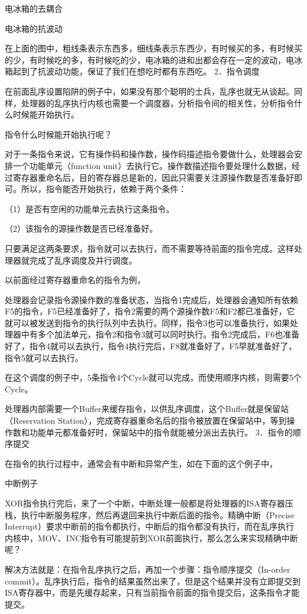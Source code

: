 \documentclass[12pt,UTF8]{ctexbook}
\begin{document}
电冰箱的去耦合

电冰箱的抗波动

在上面的图中，粗线条表示东西多，细线条表示东西少，有时候买的多，有时候买的少，有时候吃的多，有时候吃的少，电冰箱的进和出都会存在一定的波动，电冰箱起到了抗波动功能，保证了我们在想吃时都有东西吃。
2．指令调度

在前面乱序设置陷阱的例子中，如果没有那个聪明的士兵，乱序也就无从谈起。同样，处理器的乱序执行内核也需要一个调度器，分析指令间的相关性，分析指令什么时候能开始执行。

指令什么时候能开始执行呢？

对于一条指令来说，它有操作码和操作数，操作码描述指令要做什么，处理器会安排一个功能单元（function unit）去执行它。操作数描述指令要处理什么数据，经过寄存器重命名后，目的寄存器总是新的，因此只需要关注源操作数是否准备好即可。所以，指令能否开始执行，依赖于两个条件：

（1）是否有空闲的功能单元去执行这条指令。

（2）该指令的源操作数是否已经准备好。

只要满足这两条要求，指令就可以去执行，而不需要等待前面的指令完成。这样处理器就完成了乱序调度及并行调度。

以前面经过寄存器重命名的指令为例，

处理器会记录指令源操作数的准备状态，当指令1完成后，处理器会通知所有依赖F5的指令，F5已经准备好了，指令2需要的两个源操作数F5和F2都已准备好，它就可以被发送到指令的执行队列中去执行。同样，指令3也可以准备执行，如果处理器中有多个加法单元，指令2和指令3就可以同时执行。指令2完成后，F6也准备好了，指令4就可以去执行，指令4执行完后，F8就准备好了，F5早就准备好了，指令5就可以去执行。

在这个调度的例子中，5条指令4个Cycle就可以完成，而使用顺序内核，则需要5个Cycle。

处理器内部需要一个Buffer来缓存指令，以供乱序调度，这个Buffer就是保留站（Reservation Station），完成寄存器重命名后的指令被放置在保留站中，等到操作数和功能单元都准备好时，保留站中的指令就能被分派出去执行。
3．指令的顺序提交

在指令的执行过程中，通常会有中断和异常产生，如在下面的这个例子中，

中断例子

XOR指令执行完后，来了一个中断，中断处理一般都是将处理器的ISA寄存器压栈，执行中断服务程序，然后再退回来执行中断后面的指令。精确中断（Precise Interrupt）要求中断前的指令都执行，中断后的指令都没有执行，而在乱序执行内核中，MOV、INC指令有可能提前到XOR前面执行，那么怎么来实现精确中断呢？

解决方法就是：在指令乱序执行之后，再加一个步骤：指令顺序提交（In-order commit）。乱序执行后，指令的结果虽然出来了，但是这个结果并没有立即提交到ISA寄存器中，而是先缓存起来，只有当前指令前面的指令提交后，这条指令才能提交。
\end{document}
